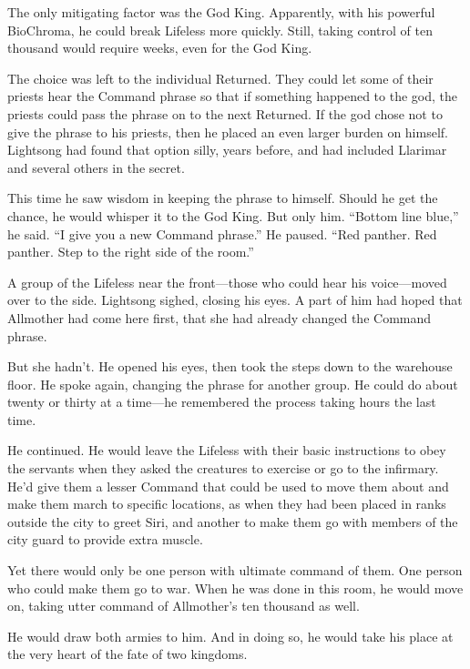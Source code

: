The only mitigating factor was the God King. Apparently, with his powerful BioChroma, he could break Lifeless more quickly. Still, taking control of ten thousand would require weeks, even for the God King.

The choice was left to the individual Returned. They could let some of their priests hear the Command phrase so that if something happened to the god, the priests could pass the phrase on to the next Returned. If the god chose not to give the phrase to his priests, then he placed an even larger burden on himself. Lightsong had found that option silly, years before, and had included Llarimar and several others in the secret.

This time he saw wisdom in keeping the phrase to himself. Should he get the chance, he would whisper it to the God King. But only him. “Bottom line blue,” he said. “I give you a new Command phrase.” He paused. “Red panther. Red panther. Step to the right side of the room.”

A group of the Lifeless near the front—those who could hear his voice—moved over to the side. Lightsong sighed, closing his eyes. A part of him had hoped that Allmother had come here first, that she had already changed the Command phrase.

But she hadn’t. He opened his eyes, then took the steps down to the warehouse floor. He spoke again, changing the phrase for another group. He could do about twenty or thirty at a time—he remembered the process taking hours the last time.

He continued. He would leave the Lifeless with their basic instructions to obey the servants when they asked the creatures to exercise or go to the infirmary. He’d give them a lesser Command that could be used to move them about and make them march to specific locations, as when they had been placed in ranks outside the city to greet Siri, and another to make them go with members of the city guard to provide extra muscle.

Yet there would only be one person with ultimate command of them. One person who could make them go to war. When he was done in this room, he would move on, taking utter command of Allmother’s ten thousand as well.

He would draw both armies to him. And in doing so, he would take his place at the very heart of the fate of two kingdoms.

